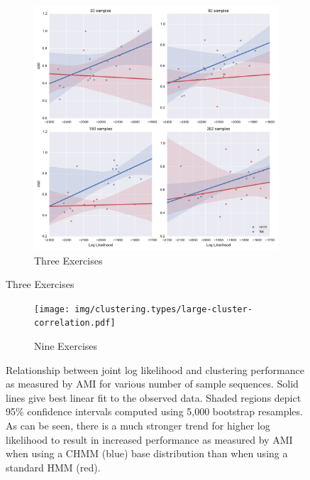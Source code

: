 \documentclass[12pt]{report}
\newcommand{\1}[0]{\mathbbm{1}}
\begin{document}
\begin{figure}[H]
    \centering
    \begin{subfigure}{\textwidth}
        \includegraphics[width=\textwidth]{img/clustering.types/cluster-correlation.pdf}
        \caption{Three Exercises}
        \label{fig:cluster-type-confusion-3}
    \end{subfigure}
\end{figure}

\begin{figure}[H]
    \centering
    \begin{subfigure}{\textwidth}
        \texttt{[image: img/clustering.types/large-cluster-correlation.pdf]}
        \caption{Nine Exercises}
        \label{fig:cluster-type-confusion-9}
    \end{subfigure}
    \caption[Relationship between log likelihood and AMI]{
        Relationship between joint log likelihood and clustering performance as measured
        by AMI for various number of sample sequences. Solid lines give best linear fit
        to the observed data. Shaded regions depict 95\% confidence intervals computed using
        5,000 bootstrap resamples. As can be seen, there is a much stronger trend for higher
        log likelihood to result in increased performance as measured by AMI when using a
        \ac{CHMM} (blue) base distribution than when using a standard \ac{HMM} (red).
    }
    \label{fig:cluster-type-correlation}
\end{figure}
\end{document}
